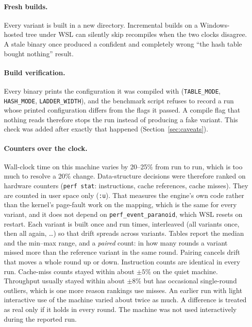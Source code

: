 \documentclass[10pt,a4paper]{article}
\newcommand{\code}[1]{\texttt{#1}}
\begin{document}
\paragraph{Fresh builds.} Every variant is built in a new directory. Incremental builds on a Windows-hosted
tree under WSL can silently skip recompiles when the two clocks disagree. A stale binary once produced a confident and completely
wrong ``the hash table bought nothing'' result.

\paragraph{Build verification.} Every binary prints the configuration it was compiled with (\code{TABLE\_MODE}, \code{HASH\_MODE}, \code{LADDER\_WIDTH}),
and the benchmark script refuses to record a run whose printed configuration differs from the flags it passed.
A compile flag that nothing reads therefore stops the run instead of producing a fake variant.
This check was added after exactly that happened (Section~\ref{sec:caveats}).

\paragraph{Counters over the clock.} Wall-clock time on this machine varies by 20--25\% from run to run, which is too much to resolve a 20\% change.
Data-structure decisions were therefore ranked on hardware counters (\code{perf stat}: instructions, cache references, cache misses).
They are counted in user space only (\code{:u}). That measures the engine's own code rather than the kernel's page-fault work on the mapping,
which is the same for every variant, and it does not depend on \code{perf\_event\_paranoid}, which WSL resets on restart.
Each variant is built once and run \CountersReps{} times, interleaved (all variants once, then all again, \ldots) so that drift spreads across variants.
Tables report the median and the min--max range, and a \emph{paired} count: in how many rounds a variant missed more than the reference variant in the same round.
Pairing cancels drift that moves a whole round up or down.
Instruction counts are identical in every run. Cache-miss counts stayed within about $\pm5\%$ on the quiet machine.
Throughput usually stayed within about $\pm8\%$ but has occasional single-round outliers, which is one more reason rankings use misses.
An earlier run with light interactive use of the machine varied about twice as much.
A difference is treated as real only if it holds in every round.
The machine was not used interactively during the reported run.
\end{document}
